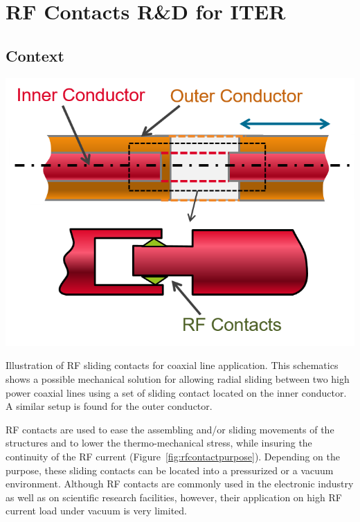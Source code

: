 {\clearpage

\section{RF Contacts R\&D for ITER}\label{sec:RF_contacts}
\subsection{Context}

\begin{marginfigure}
	\centering
	\includegraphics[width=1.0\linewidth]{figures/chap3/RF_contacts/RF_contact_purpose}
	\caption{Illustration of RF sliding contacts for coaxial line application. This schematics shows a possible mechanical solution for allowing radial sliding between two high power coaxial lines using a set of sliding contact located on the inner conductor. A similar setup is found for the outer conductor.}
	\label{fig:rfcontactpurpose}
\end{marginfigure}

RF contacts are used to ease the assembling and/or sliding movements of the structures and to lower the thermo-mechanical stress, while insuring the continuity of the RF current (Figure~\ref{fig:rfcontactpurpose}). Depending on the purpose, these sliding contacts can be located into a pressurized or a vacuum environment. Although RF contacts are commonly used in the electronic industry as well as on scientific research facilities, however, their application on high RF current load under vacuum is very limited. 


}
